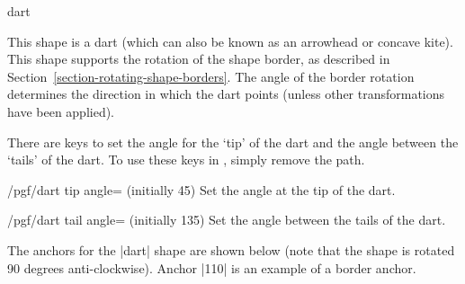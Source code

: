 \begin{shape}{dart}


	This shape is a dart (which can also be known as an arrowhead or
	concave kite). This shape supports the rotation of the shape border,
	as described in Section~\ref{section-rotating-shape-borders}.
	The angle of the border rotation determines the direction in which
	the dart points (unless other transformations have been applied).
	
	There are \pgfname{} keys to set the
	angle for the `tip' of the dart and the angle between the `tails'
	of the dart.
	To use these keys in \tikzname, simply remove the 
	path.

\begin{codeexample}[]
\end{codeexample}

	\begin{key}{/pgf/dart tip angle= (initially 45)}
		Set the angle at the tip of the dart.
	\end{key}
	
	\begin{key}{/pgf/dart tail angle= (initially 135)}
		Set the angle between the tails of the dart.
	\end{key}
		
	The anchors for the |dart| shape are shown below (note that the
	shape is rotated 90 degrees anti-clockwise). Anchor |110| is an
	example of a border anchor.
\begin{codeexample}[]
\Huge
{}
\end{codeexample}
\end{shape}




